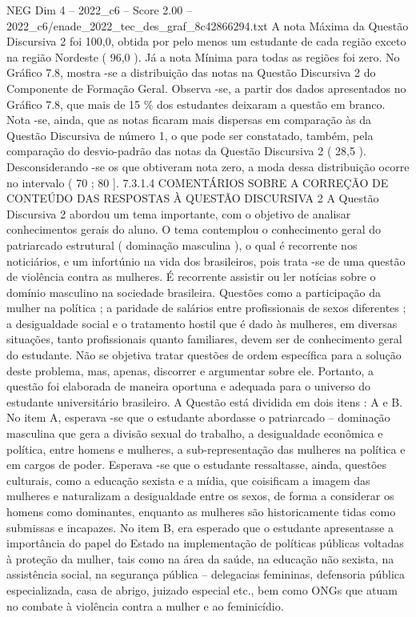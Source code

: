 \begin{textsample}{NEG Dim 4 – 2022\_c6 – Score 2.00 – 2022\_c6/enade\_2022\_tec\_des\_graf\_8c42866294.txt}
A nota Máxima da Questão Discursiva 2 foi 100,0, obtida por pelo menos um estudante de cada região exceto na região Nordeste ( 96,0 ).
Já a nota Mínima para todas as regiões foi zero.
No Gráfico 7.8, mostra -se a distribuição das notas na Questão Discursiva 2 do Componente de Formação Geral.
Observa -se, a partir dos dados apresentados no Gráfico 7.8, que mais de 15 \% dos estudantes deixaram a questão em branco.
Nota -se, ainda, que as notas ficaram mais dispersas em comparação às da Questão Discursiva de número 1, o que pode ser constatado, também, pela comparação do desvio-padrão das notas da Questão Discursiva 2 ( 28,5 ).
Desconsiderando -se os que obtiveram nota zero, a moda dessa distribuição ocorre no intervalo ( 70 ; 80 ]. 7.3.1.4 COMENTÁRIOS SOBRE A CORREÇÃO DE CONTEÚDO DAS RESPOSTAS À QUESTÃO DISCURSIVA 2 A Questão Discursiva 2 abordou um tema importante, com o objetivo de analisar conhecimentos gerais do aluno.
O tema contemplou o conhecimento geral do patriarcado estrutural ( dominação masculina ), o qual é recorrente nos noticiários, e um infortúnio na vida dos brasileiros, pois trata -se de uma questão de violência contra as mulheres.
É recorrente assistir ou ler notícias sobre o domínio masculino na sociedade brasileira.
Questões como a participação da mulher na política ; a paridade de salários entre profissionais de sexos diferentes ; a desigualdade social e o tratamento hostil que é dado às mulheres, em diversas situações, tanto profissionais quanto familiares, devem ser de conhecimento geral do estudante.
Não se objetiva tratar questões de ordem específica para a solução deste problema, mas, apenas, discorrer e argumentar sobre ele.
Portanto, a questão foi elaborada de maneira oportuna e adequada para o universo do estudante universitário brasileiro.
A Questão está dividida em dois itens : A e B.
No item A, esperava -se que o estudante abordasse o patriarcado – dominação masculina que gera a divisão sexual do trabalho, a desigualdade econômica e política, entre homens e mulheres, a sub-representação das mulheres na política e em cargos de poder.
Esperava -se que o estudante ressaltasse, ainda, questões culturais, como a educação sexista e a mídia, que coisificam a imagem das mulheres e naturalizam a desigualdade entre os sexos, de forma a considerar os homens como dominantes, enquanto as mulheres são historicamente tidas como submissas e incapazes.
No item B, era esperado que o estudante apresentasse a importância do papel do Estado na implementação de políticas públicas voltadas à proteção da mulher, tais como na área da saúde, na educação não sexista, na assistência social, na segurança pública – delegacias femininas, defensoria pública especializada, casa de abrigo, juizado especial etc., bem como ONGs que atuam no combate à violência contra a mulher e ao feminicídio.

\end{textsample}

